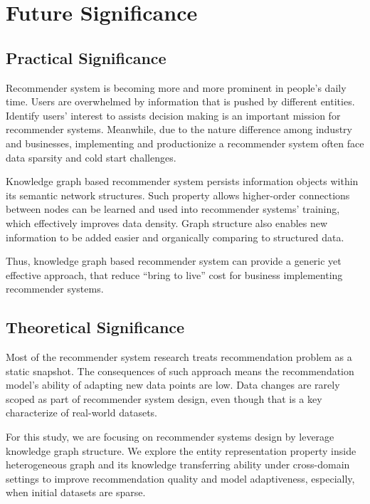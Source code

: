 \section{Future Significance}

\subsection{Practical Significance}
Recommender system is becoming more and more prominent in people's daily time. Users are overwhelmed by information that is pushed by different entities. Identify users' interest to assists decision making is an important mission for recommender systems. Meanwhile, due to the nature difference among industry and businesses, implementing and productionize a recommender system often face data sparsity and cold start challenges.  

Knowledge graph based recommender system persists information objects within its semantic network structures. Such property allows higher-order connections between nodes can be learned and used into recommender systems' training, which effectively improves data density. Graph structure also enables new information to be added easier and organically comparing to structured data.  

Thus, knowledge graph based recommender system can provide a generic yet effective approach, that reduce “bring to live” cost for business implementing recommender systems. 

\subsection{Theoretical Significance}
Most of the recommender system research treats recommendation problem as a static snapshot. The consequences of such approach means the recommendation model's ability of adapting new data points are low. Data changes are rarely scoped as part of recommender system design, even though that is a key characterize of real-world datasets. 

For this study, we are focusing on recommender systems design by leverage knowledge graph structure. We explore the entity representation property inside heterogeneous graph and its knowledge transferring ability under cross-domain settings to improve recommendation quality and model adaptiveness, especially, when initial datasets are sparse.


